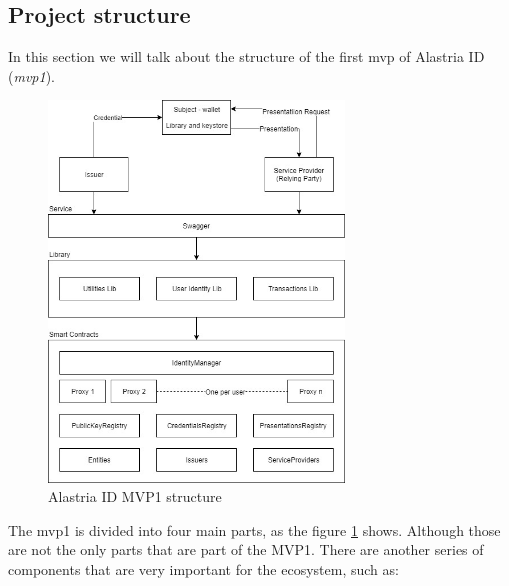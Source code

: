 \documentclass[a4paper, 12pt]{article} %
\begin{document}
    \subsection{Project structure}
        In this section we will talk about the structure of the first \acrlong{mvp} of Alastria ID (\textit{\acrshort{mvp}1})\cite{ala-mvp1}.\\
        \begin{figure}[h]
            \centering
            \includegraphics[width=0.7\textwidth]{alastria-mvp1.jpg}
            \caption{Alastria ID MVP1 structure}
            \label{fig:ala_structure}
        \end{figure}
        The \acrshort{mvp}1 is divided into four main parts, as the figure \ref{fig:ala_structure} shows. Although those are not the only parts that are part of the MVP1. There are another series of components that are very important for the ecosystem, such as:
\end{document}
